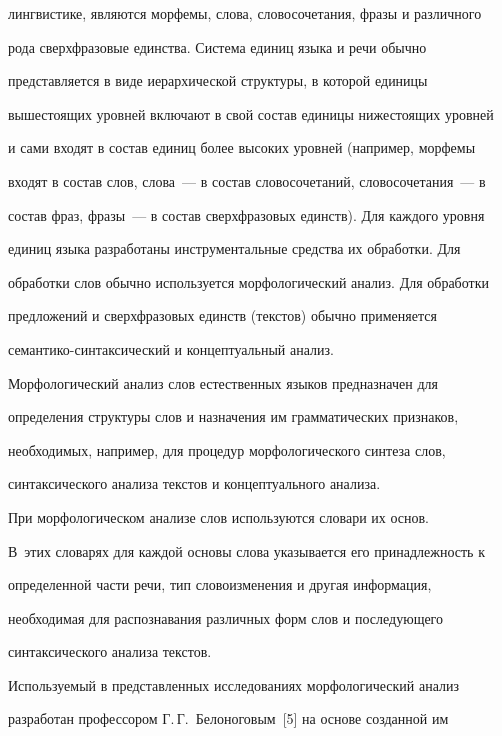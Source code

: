 лингвистике, являются морфемы, слова, словосочетания, фразы и различного 

рода сверхфразовые единства. Система единиц языка и речи обычно 

представляется в виде иерархической структуры, в которой единицы 

вышестоящих уровней включают в свой состав единицы нижестоящих уровней 

и сами входят в состав единиц более высоких уровней (например, морфемы 

входят в состав слов, слова~--- в состав словосочетаний, словосочетания~--- в 

состав фраз, фразы~--- в состав сверхфразовых единств). Для каждого уровня 

единиц языка разработаны инструментальные средства их обработки. Для 

обработки слов обычно используется морфологический анализ. Для обработки 

предложений и сверхфразовых единств (текстов) обычно применяется 

     се\-ман\-ти\-ко-син\-так\-си\-че\-ский и концептуальный анализ.







     Морфологический анализ слов естественных языков предназначен для 

определения структуры слов и назначения им грамматических признаков, 

необходимых, например, для процедур морфологического синтеза слов, 

синтаксического анализа текстов и концептуального анализа.

     

     При морфологическом анализе слов используются словари их основ. 

В~этих словарях для каждой основы слова указывается его принадлежность к 

определенной части речи, тип словоизменения и другая информация, 

необходимая для распознавания различных форм слов и последующего 

синтаксического анализа текстов. 

     

     Используемый в представленных исследованиях морфологический анализ 

разработан профессором Г.\,Г.~Белоноговым~[5] на основе созданной им 

